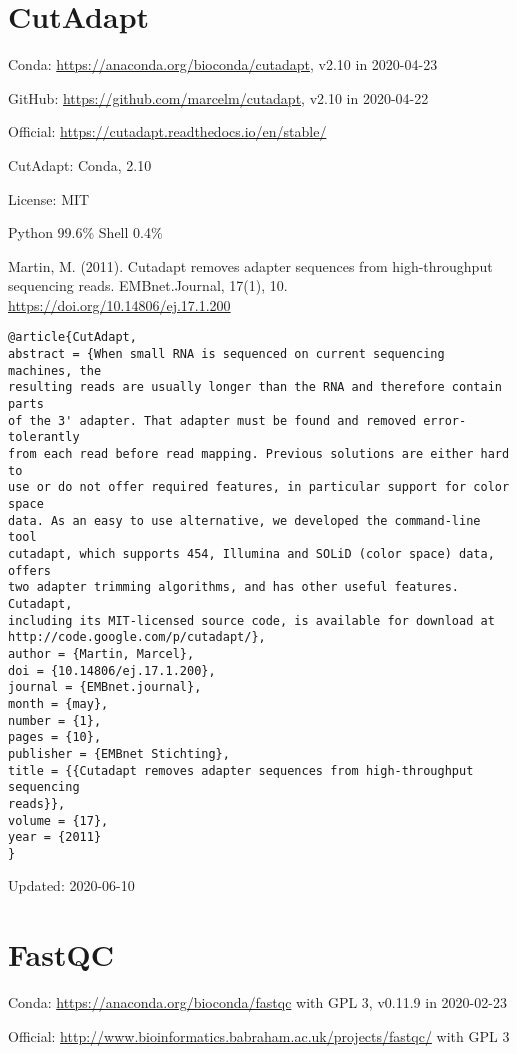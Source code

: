 \documentclass[]{article}
\begin{document}
\section{CutAdapt}

Conda: \url{https://anaconda.org/bioconda/cutadapt}, v2.10 in 2020-04-23

GitHub: \url{https://github.com/marcelm/cutadapt}, v2.10 in 2020-04-22

Official: \url{https://cutadapt.readthedocs.io/en/stable/}

CutAdapt: Conda, 2.10

License: MIT

Python 99.6\% Shell 0.4\%

Martin, M. (2011). Cutadapt removes adapter sequences from high-throughput sequencing reads. EMBnet.Journal, 17(1), 10. \url{https://doi.org/10.14806/ej.17.1.200}

\begin{verbatim}
@article{CutAdapt,
abstract = {When small RNA is sequenced on current sequencing machines, the
resulting reads are usually longer than the RNA and therefore contain parts
of the 3' adapter. That adapter must be found and removed error-tolerantly
from each read before read mapping. Previous solutions are either hard to
use or do not offer required features, in particular support for color space
data. As an easy to use alternative, we developed the command-line tool
cutadapt, which supports 454, Illumina and SOLiD (color space) data, offers
two adapter trimming algorithms, and has other useful features.   Cutadapt,
including its MIT-licensed source code, is available for download at
http://code.google.com/p/cutadapt/},
author = {Martin, Marcel},
doi = {10.14806/ej.17.1.200},
journal = {EMBnet.journal},
month = {may},
number = {1},
pages = {10},
publisher = {EMBnet Stichting},
title = {{Cutadapt removes adapter sequences from high-throughput sequencing
reads}},
volume = {17},
year = {2011}
}
\end{verbatim}

Updated: 2020-06-10

\section{FastQC}

Conda: \url{https://anaconda.org/bioconda/fastqc} with GPL 3, v0.11.9 in 2020-02-23

Official: \url{http://www.bioinformatics.babraham.ac.uk/projects/fastqc/} with GPL 3
\end{document}

